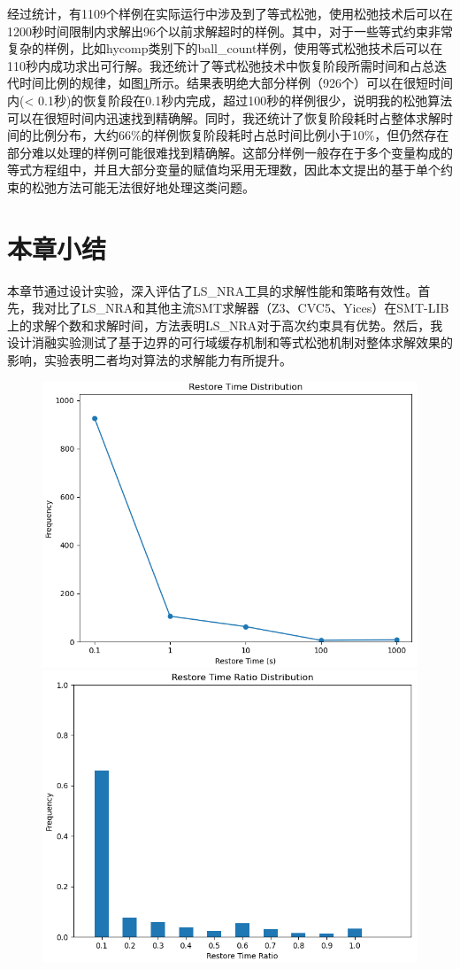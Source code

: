 经过统计，有1109个样例在实际运行中涉及到了等式松弛，使用松弛技术后可以在1200秒时间限制内求解出96个以前求解超时的样例。其中，对于一些等式约束非常复杂的样例，比如hycomp类别下的ball\_count样例，使用等式松弛技术后可以在110秒内成功求出可行解。我还统计了等式松弛技术中恢复阶段所需时间和占总迭代时间比例的规律，如图\ref{fig:restore2}所示。结果表明绝大部分样例（926个）可以在很短时间内(< 0.1秒)的恢复阶段在0.1秒内完成，超过100秒的样例很少，说明我的松弛算法可以在很短时间内迅速找到精确解。同时，我还统计了恢复阶段耗时占整体求解时间的比例分布，大约66\%的样例恢复阶段耗时占总时间比例小于10\%，但仍然存在部分难以处理的样例可能很难找到精确解。这部分样例一般存在于多个变量构成的等式方程组中，并且大部分变量的赋值均采用无理数，因此本文提出的基于单个约束的松弛方法可能无法很好地处理这类问题。

\section{本章小结}
本章节通过设计实验，深入评估了LS\_NRA工具的求解性能和策略有效性。首先，我对比了LS\_NRA和其他主流SMT求解器（Z3、CVC5、Yices）在SMT-LIB上的求解个数和求解时间，方法表明LS\_NRA对于高次约束具有优势。然后，我设计消融实验测试了基于边界的可行域缓存机制和等式松弛机制对整体求解效果的影响，实验表明二者均对算法的求解能力有所提升。

\begin{figure}[t]
    \centering
    \includegraphics[width=0.45\columnwidth]{Img/restore_time.png}\qquad
    \includegraphics[width=0.45\columnwidth]{Img/restore_ratio.png}
\label{fig:restore2}
\end{figure}

